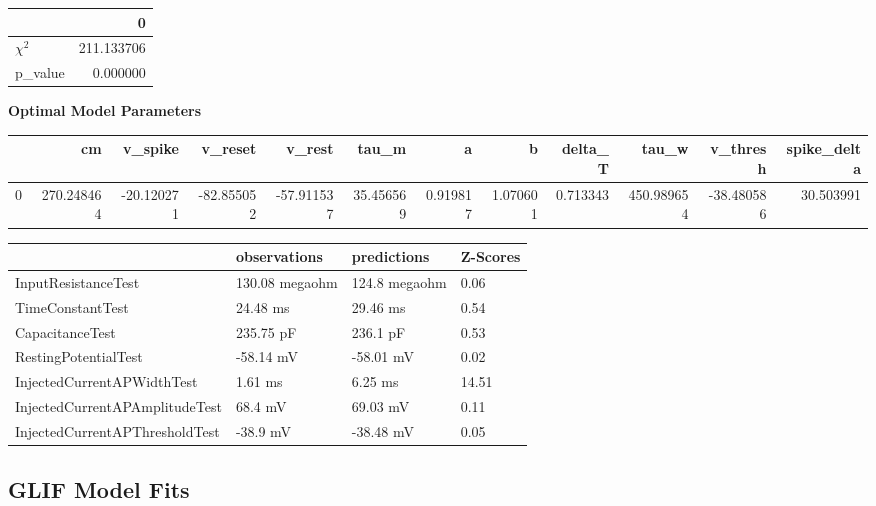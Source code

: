\begin{tabular}{lr}
\toprule
{} &           0 \\
\midrule
$\chi^{2}$ &  211.133706 \\
p\_value    &    0.000000 \\
\bottomrule
\end{tabular}
\textbf{Optimal Model Parameters} \begin{tabular}{lrrrrrrrrrrr}
\toprule
{} &          cm &    v\_spike &    v\_reset &     v\_rest &      tau\_m &         a &         b &   delta\_T &       tau\_w &   v\_thresh &  spike\_delta \\
\midrule
0 &  270.248464 & -20.120271 & -82.855052 & -57.911537 &  35.456569 &  0.919817 &  1.070601 &  0.713343 &  450.989654 & -38.480586 &    30.503991 \\
\bottomrule
\end{tabular}
\begin{tabular}{llll}
\toprule
{} &    observations &    predictions & Z-Scores \\
\midrule
InputResistanceTest            &  130.08 megaohm &  124.8 megaohm &     0.06 \\
TimeConstantTest               &        24.48 ms &       29.46 ms &     0.54 \\
CapacitanceTest                &       235.75 pF &       236.1 pF &     0.53 \\
RestingPotentialTest           &       -58.14 mV &      -58.01 mV &     0.02 \\
InjectedCurrentAPWidthTest     &         1.61 ms &        6.25 ms &    14.51 \\
InjectedCurrentAPAmplitudeTest &         68.4 mV &       69.03 mV &     0.11 \\
InjectedCurrentAPThresholdTest &        -38.9 mV &      -38.48 mV &     0.05 \\
\bottomrule
\end{tabular}

\subsection{GLIF Model Fits}
